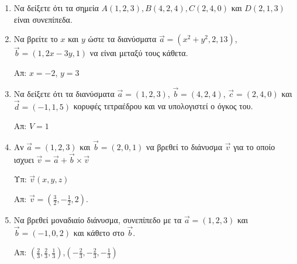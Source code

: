 \begin{enumerate}
	\item Να δείξετε ότι τα σημεία $ A(1,2,3), B(4,2,4), C(2,4,0) $ και $ D(2,1,3) $ είναι συνεπίπεδα.

	\item Να βρείτε το $x$ και $y$ ώστε τα διανύσματα $ \vec{a} = (x^{2}+y^{2},2,13) $, $ \vec{b} = (1,2x-3y,1) $ να είναι μεταξύ τους κάθετα. 

		\hfill Απ: $ x=-2 $, $ y=3 $

	\item Να δείξετε ότι τα διανύσματα $ \vec{a} = (1,2,3) $, $ \vec{b} = (4,2,4) $, $ \vec{c} = (2,4,0) $ και $ \vec{d} = (-1,1,5) $ κορυφές τετραέδρου και να υπολογιστεί ο όγκος του.
		
		\hfill Απ: $ V=1 $

	\item Αν $ \vec{a} = (1,2,3) $ και $ \vec{b} = (2,0,1) $ να βρεθεί το διάνυσμα $ \vec{v}$ για το
		οποίο ισχυει $ \vec{v} = \vec{a} + \vec{b} \times \vec{v} $ 

		\hfill Υπ: $ \vec{v} (x,y,z) $

		\hfill Απ: $ \vec{v} = (\frac{3}{2}, - \frac{1}{2}, 2) $.

	\item Να βρεθεί μοναδιαίο διάνυσμα, συνεπίπεδο με τα $ \vec{a} = (1,2,3) $ και $ \vec{b} =
		(-1,0,2) $ και κάθετο στο $ \vec{b} $.


		\hfill Απ: $ (\frac{2}{3}, \frac{2}{3}, \frac{1}{3}) $,$ (-\frac{2}{3},- \frac{2}{3}, -\frac{1}{3})$  
\end{enumerate}


